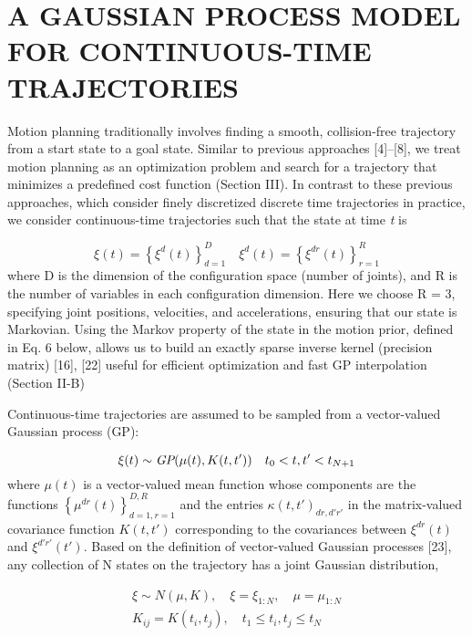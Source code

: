 \documentclass{IEEEtran}
\begin{document}
\section{A GAUSSIAN PROCESS MODEL FOR CONTINUOUS-TIME TRAJECTORIES}
Motion planning traditionally involves finding a smooth,
collision-free trajectory from a start state to a goal state.
Similar to previous approaches [4]–[8], we treat motion planning as an optimization problem and search for a trajectory
that minimizes a predefined cost function (Section III). In
contrast to these previous approaches, which consider finely
discretized discrete time trajectories in practice, we consider
continuous-time trajectories such that the state at time \emph{t} is 

\begin{equation}
\xi(t)=\left\{\xi^d(t)\right\}^D_{d=1} \quad
\xi^d(t)=\left\{\xi^{dr}(t)\right\}^R_{r=1}
\end{equation}
where D is the dimension of the configuration space (number
of joints), and R is the number of variables in each configuration dimension. Here we choose R = 3, specifying joint
positions, velocities, and accelerations, ensuring that our
state is Markovian. Using the Markov property of the state in
the motion prior, defined in Eq. 6 below, allows us to build
an exactly sparse inverse kernel (precision matrix) [16], [22]
useful for efficient optimization and fast GP interpolation
(Section II-B)

Continuous-time trajectories are assumed to be sampled
from a vector-valued Gaussian process (GP):

\begin{equation}
\xi(t)\sim{\emph{GP}}(\mu(t),K(t,t')) \quad 
t_0<t,t'<t_{N+1}
\end{equation}
where $\mu(t)$ is a vector-valued mean function whose components are the functions $\left\{\mu^{dr}{(t)}\right\}^{D,R}_{d=1,r=1}$ and the entries $\kappa(t,t')_{{dr},{d'r'}}$ in the matrix-valued covariance function  $K(t,t')$ corresponding to the covariances between $\xi^{dr}(t)$ and $\xi^{d'r'}(t')$. Based on the definition of vector-valued Gaussian
processes [23], any collection of N states on the trajectory
has a joint Gaussian distribution,

\begin{equation}
\begin{split}
\xi\sim{N(\mu,K)},\quad \xi=\xi_{1:N}, \quad \mu=\mu_{1:N} \\
K_{ij}=K(t_i,t_j),\quad 
t_1\leq{t_i},t_j\leq{t_N}
\end{split}
\end{equation}
\end{document}
